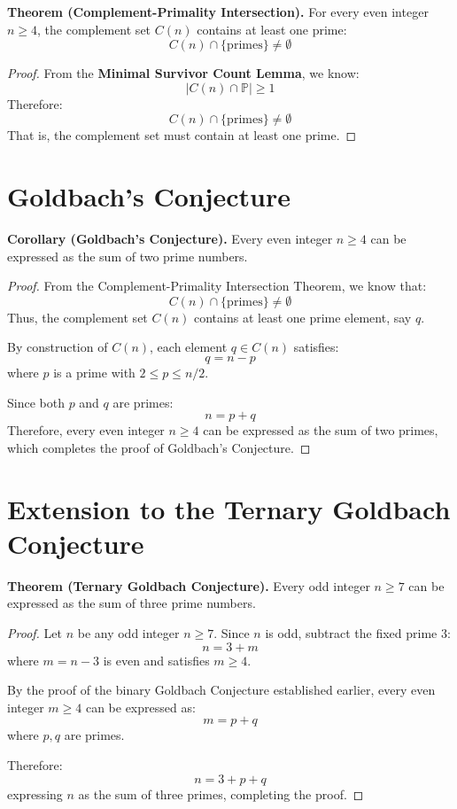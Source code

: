 \documentclass[11pt]{article}
\begin{document}
	\textbf{Theorem (Complement-Primality Intersection).}  
	For every even integer \( n \geq 4 \), the complement set \( C(n) \) contains at least one prime:
	\[
	C(n) \cap \{\text{primes}\} \neq \emptyset
	\]
	
	\begin{proof}
		From the \textbf{Minimal Survivor Count Lemma}, we know:
		\[
		|C(n) \cap \mathbb{P}| \geq 1
		\]
		Therefore:
		\[
		C(n) \cap \{\text{primes}\} \neq \emptyset
		\]
		That is, the complement set must contain at least one prime.
	\end{proof}
	



	
	\section{Goldbach's Conjecture}
	
	\textbf{Corollary (Goldbach’s Conjecture).}  
	Every even integer \( n \geq 4 \) can be expressed as the sum of two prime numbers.
	
	\begin{proof}
		From the Complement-Primality Intersection Theorem, we know that:
		\[
		C(n) \cap \{\text{primes}\} \neq \emptyset
		\]
		Thus, the complement set \( C(n) \) contains at least one prime element, say \( q \).
		
		By construction of \( C(n) \), each element \( q \in C(n) \) satisfies:
		\[
		q = n - p
		\]
		where \( p \) is a prime with \( 2 \leq p \leq n/2 \).
		
		Since both \( p \) and \( q \) are primes:
		\[
		n = p + q
		\]
		Therefore, every even integer \( n \geq 4 \) can be expressed as the sum of two primes, which completes the proof of Goldbach’s Conjecture.
	\end{proof}

	
	\section{Extension to the Ternary Goldbach Conjecture}
	
	\textbf{Theorem (Ternary Goldbach Conjecture).}  
	Every odd integer $n \geq 7$ can be expressed as the sum of three prime numbers.
	
	\begin{proof}
		Let $n$ be any odd integer $n \geq 7$. Since $n$ is odd, subtract the fixed prime $3$:
		\[
		n = 3 + m
		\]
		where $m = n - 3$ is even and satisfies $m \geq 4$.
		
		By the proof of the binary Goldbach Conjecture established earlier, every even integer $m \geq 4$ can be expressed as:
		\[
		m = p + q
		\]
		where $p, q$ are primes.
		
		Therefore:
		\[
		n = 3 + p + q
		\]
		expressing $n$ as the sum of three primes, completing the proof.
	\end{proof}
	
\end{document}
